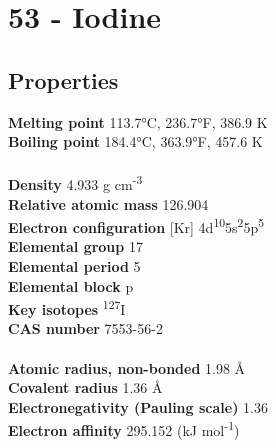 \section{53 - Iodine}
\label{sec:elem-iodine}
\subsection{Properties}
\textbf{Melting point} 113.7°C, 236.7°F, 386.9 K\\
\textbf{Boiling point} 184.4°C, 363.9°F, 457.6 K\\
\\
\textbf{Density} 4.933 g cm\textsuperscript{-3}\\
\textbf{Relative atomic mass} 126.904\\
\textbf{Electron configuration} [Kr] 4d\textsuperscript{10}5s\textsuperscript{2}5p\textsuperscript{5}\\
\textbf{Elemental group} 17\\
\textbf{Elemental period} 5\\
\textbf{Elemental block} p\\
\textbf{Key isotopes} \textsuperscript{127}I\\
\textbf{CAS number} 7553-56-2\\
\\
\textbf{Atomic radius, non-bonded} 1.98 Å\\
\textbf{Covalent radius} 1.36 Å\\
\textbf{Electronegativity (Pauling scale)} 1.36\\
\textbf{Electron affinity} 295.152 (kJ mol\textsuperscript{-1})\\